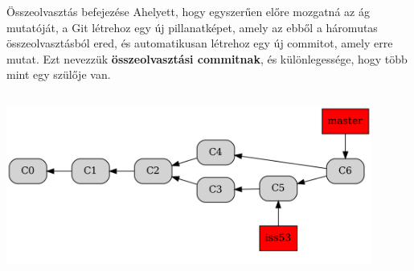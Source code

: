 \documentclass[english, aspectratio=169]{beamer}
\begin{document}
\begin{frame}{Összeolvasztás befejezése}
Ahelyett, hogy egyszerűen előre mozgatná az ág mutatóját, a Git létrehoz egy új pillanatképet, amely az ebből a háromutas összeolvasztásból ered, és automatikusan létrehoz egy új commitot, amely erre mutat. Ezt nevezzük \textbf{összeolvasztási commitnak}, és különlegessége, hogy több mint egy szülője van.
\begin{center}
\includegraphics[height=6cm, width=12cm, keepaspectratio]{graphs/git_17.png}
\end{center}
\end{frame}
\end{document}
